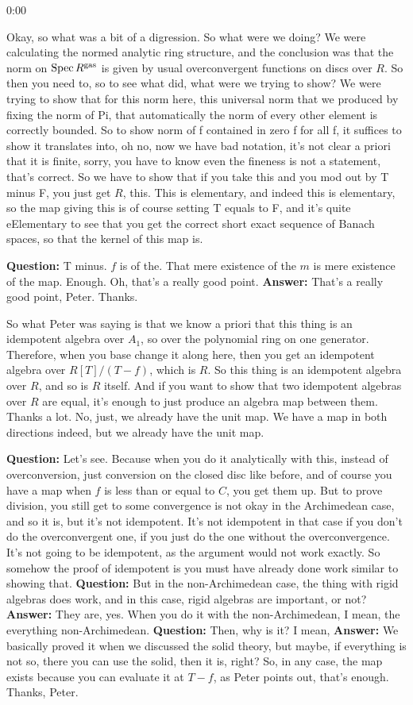 \begin{unfinished}{0:00}
{%
Okay, so what was a bit of a digression. So what were we doing? We were calculating the normed analytic ring structure, and the conclusion was that the norm on $\operatorname{Spec} R^{\mathrm{gas}}$ is given by usual overconvergent functions on discs over $R$. So then you need to, so to see what did, what were we trying to show? We were trying to show that for this norm here, this universal norm that we produced by fixing the norm of Pi, that automatically the norm of every other element is correctly bounded. So to show norm of f contained in zero f for all f, it suffices to show it translates into, 
oh no, now we have bad notation, it's not clear a priori that it is finite, sorry, you have to know even the fineness is not a statement, that's correct. So we have to show that if you take this and you mod out by T minus F, you just get $R$, this. This is elementary, and indeed this is elementary, so the map giving this is of course setting T equals to F, and it's quite eElementary to see that you get the correct short exact sequence of Banach spaces, so that the kernel of this map is.

\textbf{Question:} T minus. $f$ is of the. That mere existence of the $m$ is mere existence of the map. Enough. Oh, that's a really good point. 
\textbf{Answer:}  That's a really good point, Peter. Thanks.

So what Peter was saying is that we know a priori that this thing is an idempotent algebra over $A_1$, so over the polynomial ring on one generator. Therefore, when you base change it along here, then you get an idempotent algebra over $R[T]/(T-f)$, which is $R$. So this thing is an idempotent algebra over $R$, and so is $R$ itself.
And if you want to show that two idempotent algebras over $R$ are equal, it's enough to just produce an algebra map between them. Thanks a lot. No, just, we already have the unit map. We have a map in both directions indeed, but we already have the unit map.

\textbf{Question:} Let's see. Because when you do it analytically with this, instead of overconversion, just conversion on the closed disc like before, and of course you have a map when $f$ is less than or equal to $C$, you get them up. But to prove division, you still get to some convergence is not okay in the Archimedean case, and so it is, but it's not idempotent. It's not idempotent in that case if you don't do the overconvergent one, if you just do the one without the overconvergence. It's not going to be idempotent, as the argument would not work exactly. So somehow the proof of idempotent is you must have already done work similar to showing that.
\textbf{Question:} But in the non-Archimedean case, the thing with rigid algebras does work, and in this case, rigid algebras are important, or not?
\textbf{Answer:} They are, yes. When you do it with the non-Archimedean, I mean, the everything non-Archimedean.
\textbf{Question:} Then, why is it? I mean, 
\textbf{Answer:} We basically proved it when we discussed the solid theory, but maybe, if everything is not so, there you can use the solid, then it is, right? So, in any case, the map exists because you can evaluate it at $T - f$, as Peter points out, that's enough. Thanks, Peter.

}
\end{unfinished}
